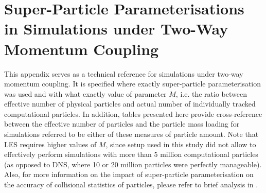 \documentclass{pracamgren}
\begin{document}
\chapter{Super-Particle Parameterisations in Simulations under Two-Way Momentum Coupling}
\label{app:spp}

This appendix serves as a technical reference for simulations under two-way momentum coupling.
It is specified where exactly super-particle parameterisation was used and with what exactly value of parameter $M$, i.e. the ratio between effective number of physical particles and actual number of individually tracked computational particles.
In addition, tables presented here provide cross-reference between the effective number of particles and the particle mass loading for simulations referred to be either of these measures of particle amount.
Note that LES requires higher values of $M$, since setup used in this study did not allow to effectively perform simulations with more than 5 million computational particles (as opposed to DNS, where 10 or 20 million particles were perfectly manageable).
Also, for more information on the impact of super-particle parameterisation on the accuracy of collisional statistics of particles, please refer to brief analysis in \textcite{Rosa2022}.  
\end{document}
